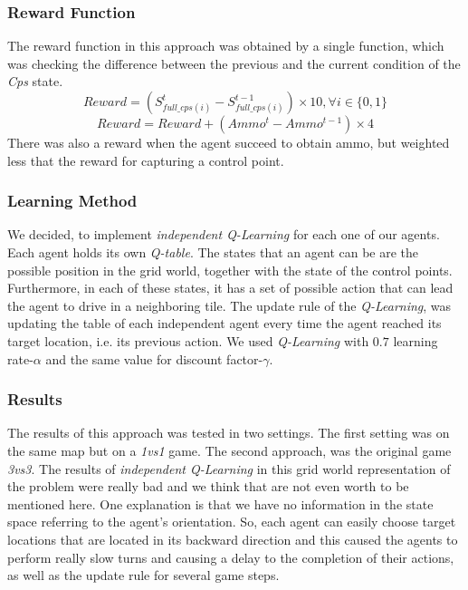 \documentclass[conference]{IEEEtran}
\begin{document}
\subsubsection{Reward Function}
The reward function in this approach was obtained by a single function, which was checking the difference between the previous and the current condition of the \textit{Cps} state.
\begin{equation}
Reward = (S^{t}_{full\_cps(i)} - S^{t-1}_{full\_cps(i)}) \times 10, \forall i \in \lbrace 0,1 \rbrace
\end{equation}
\begin{equation}
Reward = Reward + (Ammo^{t} - Ammo^{t-1}) \times 4
\end{equation}
There was also a reward when the agent succeed to obtain ammo, but weighted less that the reward for capturing a control point.

\subsubsection{Learning Method}
We decided, to implement \textit{independent Q-Learning} for each one of our agents. Each agent holds its own \textit{Q-table}. The states that an agent can be are the possible position in the grid world, together with the state of the control points. Furthermore, in each of these states, it has a set of possible action that can lead the agent to drive in a neighboring tile. The update rule of the \textit{Q-Learning}, was updating the table of each independent agent every time the agent reached its target location, i.e. its previous action. We used \textit{Q-Learning} with $0.7$ learning rate-$\alpha$ and the same value for discount factor-$\gamma$.

\subsubsection{Results}
The results of this approach was tested in two settings. The first setting was on the same map but on a \emph{1vs1} game. The second approach, was the original game \emph{3vs3}. The results of \textit{independent Q-Learning} in this grid world representation of the problem were really bad and we think that are not even worth to be mentioned here. One explanation is that we have no information in the state space referring to the agent's orientation. So, each agent can easily choose target locations that are located in its backward direction and this caused the agents to perform really slow turns and causing a delay to the completion of their actions, as well as the update rule for several game steps.
\end{document}
